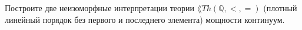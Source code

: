 Построите две неизоморфные интерпретации теории $\lang{Th}(\mathbb{Q}, <, =)$ (плотный линейный порядок без первого и
последнего элемента) мощности континуум.